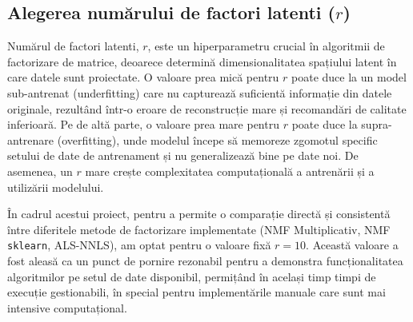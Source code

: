 \documentclass[12pt,a4paper]{article}
\begin{document}
	\subsection{Alegerea numărului de factori latenti ($r$)}
	\label{subsec:alegerea_r}
	
	Numărul de factori latenti, $r$, este un hiperparametru crucial în algoritmii de factorizare de matrice, deoarece determină dimensionalitatea spațiului latent în care datele sunt proiectate. O valoare prea mică pentru $r$ poate duce la un model sub-antrenat (underfitting) care nu capturează suficientă informație din datele originale, rezultând într-o eroare de reconstrucție mare și recomandări de calitate inferioară. Pe de altă parte, o valoare prea mare pentru $r$ poate duce la supra-antrenare (overfitting), unde modelul începe să memoreze zgomotul specific setului de date de antrenament și nu generalizează bine pe date noi. De asemenea, un $r$ mare crește complexitatea computațională a antrenării și a utilizării modelului.
	
	În cadrul acestui proiect, pentru a permite o comparație directă și consistentă între diferitele metode de factorizare implementate (NMF Multiplicativ, NMF \texttt{sklearn}, ALS-NNLS), am optat pentru o valoare fixă $r = 10$. Această valoare a fost aleasă ca un punct de pornire rezonabil pentru a demonstra funcționalitatea algoritmilor pe setul de date disponibil, permițând în același timp timpi de execuție gestionabili, în special pentru implementările manuale care sunt mai intensive computațional.
	
\end{document}

